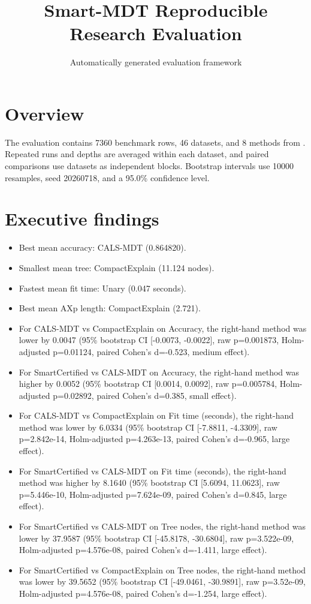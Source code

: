 \documentclass[11pt]{article}
\title{Smart-MDT Reproducible Research Evaluation}
\author{Automatically generated evaluation framework}
\date{}
\begin{document}
\maketitle

\section{Overview}
The evaluation contains 7360 benchmark rows, 46
datasets, and 8 methods from
. Repeated runs and depths are averaged within each
dataset, and paired comparisons use datasets as independent blocks. Bootstrap
intervals use 10000
resamples, seed 20260718, and a 95.0\% confidence level.

\section{Executive findings}
\begin{itemize}
  \item Best mean accuracy: CALS-MDT
        (0.864820).
  \item Smallest mean tree: CompactExplain
        (11.124 nodes).
  \item Fastest mean fit time: Unary
        (0.047 seconds).
  \item Best mean AXp length: CompactExplain
        (2.721).

  \item For CALS-MDT vs CompactExplain on Accuracy, the right-hand method was lower by 0.0047 (95\% bootstrap CI [-0.0073, -0.0022], raw p=0.001873, Holm-adjusted p=0.01124, paired Cohen's d=-0.523, medium effect).

  \item For SmartCertified vs CALS-MDT on Accuracy, the right-hand method was higher by 0.0052 (95\% bootstrap CI [0.0014, 0.0092], raw p=0.005784, Holm-adjusted p=0.02892, paired Cohen's d=0.385, small effect).

  \item For CALS-MDT vs CompactExplain on Fit time (seconds), the right-hand method was lower by 6.0334 (95\% bootstrap CI [-7.8811, -4.3309], raw p=2.842e-14, Holm-adjusted p=4.263e-13, paired Cohen's d=-0.965, large effect).

  \item For SmartCertified vs CALS-MDT on Fit time (seconds), the right-hand method was higher by 8.1640 (95\% bootstrap CI [5.6094, 11.0623], raw p=5.446e-10, Holm-adjusted p=7.624e-09, paired Cohen's d=0.845, large effect).

  \item For SmartCertified vs CALS-MDT on Tree nodes, the right-hand method was lower by 37.9587 (95\% bootstrap CI [-45.8178, -30.6804], raw p=3.522e-09, Holm-adjusted p=4.576e-08, paired Cohen's d=-1.411, large effect).

  \item For SmartCertified vs CompactExplain on Tree nodes, the right-hand method was lower by 39.5652 (95\% bootstrap CI [-49.0461, -30.9891], raw p=3.52e-09, Holm-adjusted p=4.576e-08, paired Cohen's d=-1.254, large effect).

\end{itemize}
\end{document}
